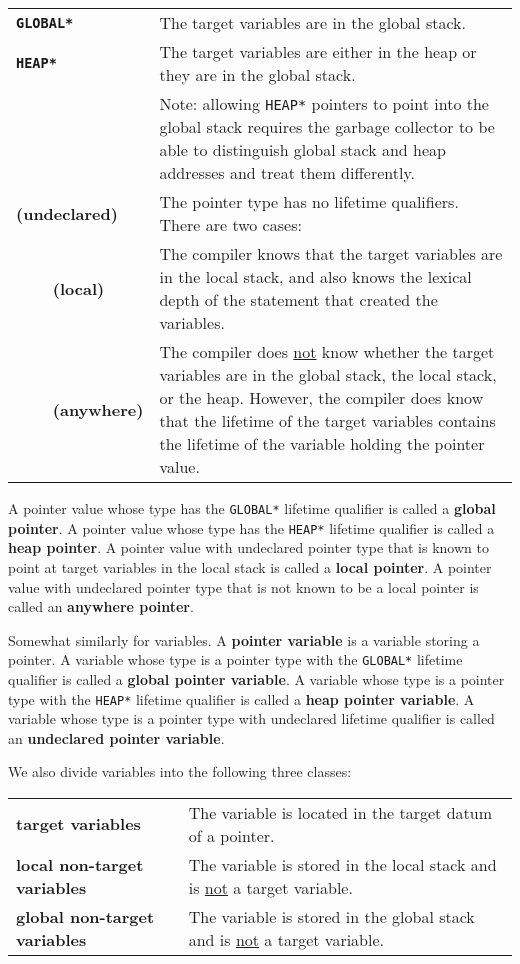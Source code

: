 \documentclass[12pt]{article}
\newcommand{\key}[1]{{\rm \bfseries #1}}
\newcommand{\ttkey}[1]{{\tt \bfseries #1}}
\newenvironment{indpar}[1][0.3in]%
	{\begin{list}{}%
		     {\setlength{\itemsep}{0in}%
		      \setlength{\topsep}{0in}%
		      \setlength{\parsep}{1ex}%
		      \setlength{\labelwidth}{#1}%
		      \setlength{\leftmargin}{#1}%
		      \addtolength{\leftmargin}{\labelsep}}%
	 \item}%
	{\end{list}}
\begin{document}
\begin{indpar}[0.2in]
\begin{tabular}{lp{4.5in}}
\ttkey{*GLOBAL*}\label{*GLOBAL*}
			& The target variables are in the global stack.
\\[1ex]
\ttkey{*HEAP*}\label{*HEAP*}
			& The target variables are either in the heap
			  or they are in the global stack.
\\[1ex]
		        & Note: allowing {\tt *HEAP*} pointers to point
			  into the global stack requires the garbage
			  collector to be able to distinguish global stack
			  and heap addresses and treat them differently.
\\[1ex]
{\bf (undeclared)}\label{UNDECLARED}
			& The pointer type has no lifetime qualifiers.
                          There are two cases:
\\[1ex]
{\bf ~~~~(local)}	& The compiler knows that the target variables are
                          in the local stack, and also knows the lexical
			  depth of the statement that created the variables.
\\[1ex]
{\bf ~~~~(anywhere)}	& The compiler does \underline{not} know whether
			  the target variables are in the global stack,
			  the local stack, or the heap.  However, the
			  compiler does know that the lifetime of the
			  target variables contains the lifetime of the
			  variable holding the pointer value.
\end{tabular}
\end{indpar}

A pointer value whose type has the {\tt *GLOBAL*} lifetime qualifier
is called a \key{global pointer}.
A pointer value whose type has the {\tt *HEAP*} lifetime qualifier
is called a \key{heap pointer}.
A pointer value with undeclared pointer type that is known
to point at target variables in the local stack is called a
\key{local pointer}.
A pointer value with undeclared pointer type that is not known to be
a local pointer is called an \key{anywhere pointer}.

Somewhat similarly for variables.
A \key{pointer variable} is a variable storing a pointer.
A variable whose type is a pointer type with
the {\tt *GLOBAL*} lifetime qualifier
is called a \key{global pointer variable}.
A variable whose type is a pointer type with
the {\tt *HEAP*} lifetime qualifier
is called a \key{heap pointer variable}.
A variable whose type is a pointer type with
undeclared lifetime qualifier
is called an \key{undeclared pointer variable}.

We also divide variables into the following three classes:
\begin{indpar}[0.2in]
\begin{tabular}{lp{3.5in}}
\key{target variables} &
	The variable is located in the target datum of a pointer.
\\[1ex]
\key{local non-target variables} &
	The variable is stored in the local stack
	and is \underline{not} a target variable.
\\[1ex]
\key{global non-target variables} &
	The variable is stored in the global stack
	and is \underline{not} a target variable.
\end{tabular}
\end{indpar}
\end{document}
